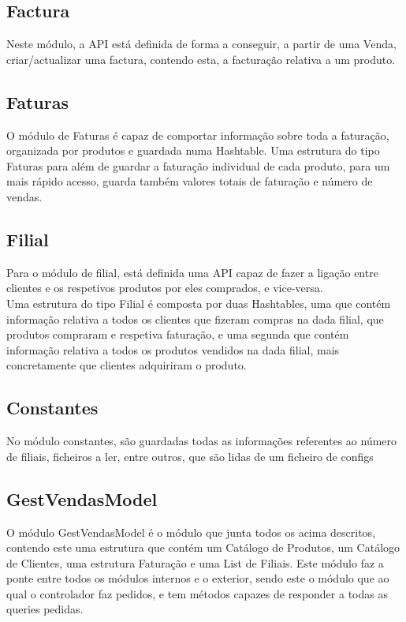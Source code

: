 \documentclass[a4paper]{report}
\begin{document}
\subsection{Factura}

Neste módulo, a API está definida de forma a conseguir, a partir de uma Venda,
criar/actualizar uma factura, contendo esta, a facturação relativa a um produto.

\subsection{Faturas}

O módulo de Faturas é capaz de comportar informação sobre toda a faturação,
organizada por produtos e guardada numa Hashtable. Uma estrutura do tipo Faturas
para além de guardar a faturação individual de cada produto, para um mais rápido 
acesso, guarda também valores totais de faturação e número de vendas.

\subsection{Filial}

Para o módulo de filial, está definida uma API capaz de fazer a ligação entre 
clientes e os respetivos produtos por eles comprados, e vice-versa.\\
Uma estrutura do tipo Filial é composta por duas Hashtables, uma que contém
informação relativa a todos os clientes que fizeram compras na dada filial, 
que produtos compraram e respetiva faturação, e uma segunda que contém 
informação relativa a todos os produtos vendidos na dada filial, mais 
concretamente que clientes adquiriram o produto.

\subsection{Constantes}

No módulo constantes, são guardadas todas as informações referentes ao número de
filiais, ficheiros a ler, entre outros, que são lidas de um ficheiro de configs

\subsection{GestVendasModel}

O módulo GestVendasModel é o módulo que junta todos os acima descritos, contendo este uma estrutura
que contém um Catálogo de Produtos, um Catálogo de Clientes, uma estrutura Faturação e 
uma List de Filiais. Este módulo faz a ponte entre todos os módulos internos e o 
exterior, sendo este o módulo que ao qual o controlador faz pedidos, e tem 
métodos capazes de responder a todas as queries pedidas.
\end{document}
